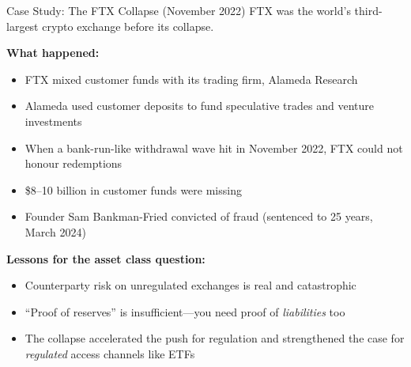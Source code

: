 \documentclass[10pt]{beamer}
\newcommand{\bad}[1]{\textcolor{AccentOrange}{#1}}
\begin{document}
\begin{frame}{Case Study: The FTX Collapse (November 2022)}
  FTX was the world's third-largest crypto exchange before its collapse.
  
  \vspace{0.5em}
  \textbf{What happened:}
  \begin{itemize}
    \item FTX mixed customer funds with its trading firm, Alameda Research
    \item Alameda used customer deposits to fund speculative trades and venture investments
    \item When a bank-run-like withdrawal wave hit in November 2022, FTX could not honour redemptions
    \item \$8--10 billion in customer funds were missing
    \item Founder Sam Bankman-Fried convicted of fraud (sentenced to 25 years, March 2024)
  \end{itemize}
  
  \vspace{0.5em}
  \textbf{Lessons for the asset class question:}
  \begin{itemize}
    \item \bad{Counterparty risk} on unregulated exchanges is real and catastrophic
    \item ``Proof of reserves'' is insufficient---you need proof of \textit{liabilities} too
    \item The collapse accelerated the push for regulation and strengthened the case for \textit{regulated} access channels like ETFs
  \end{itemize}
\end{frame}
\end{document}
